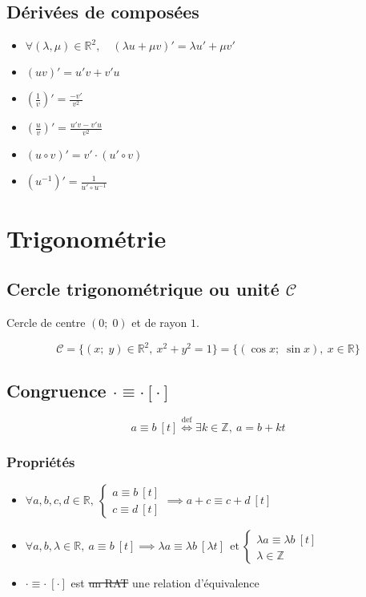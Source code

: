 \documentclass{article}
\newcommand{\R}{{\mathbb R}}
\newcommand{\Z}{{\mathbb Z}}
\newcommand{\et}{\:\text{et}\:}
\newcommand{\point}[2]{(#1;\;#2)}
\renewcommand{\cong}{\equiv}
\begin{document}
\subsection{Dérivées de composées}
\begin{itemize}
	\item $\forall (\lambda, \mu) \in \R^2,\quad (\lambda u + \mu v)' = \lambda u' + \mu v'$
	\item $(uv)' = u'v+v'u$
	\item $(\frac{1}{v})' = \frac{-v'}{v^2}$
	\item $(\frac{u}{v})' = \frac{u'v-v'u}{v^2}$
	\item $(u \circ v)' = v' \cdot  (u' \circ v)$
	\item $(u^{-1})' = \frac{1}{u' \circ u^{-1}}$
\end{itemize}

\section{Trigonométrie}
\subsection{Cercle trigonométrique ou unité $\mathcal C$}

Cercle de centre $\point{0}{0}$ et de rayon $1$.

\[
	\mathcal C = \{ \point{x}{y} \in \R^2,\: x^2 + y^2 = 1 \} = \{ \point{\cos x}{\sin x},\: x \in \R \} 
\] 

\subsection{Congruence $\cdot \cong \cdot [\cdot]$}

\[
	a \cong b\ [t] \stackrel{\text{def}}{\iff} \exists k\in \Z,\ a = b + kt

\] 
\subsubsection{Propriétés}

\begin{itemize}
	\item $\forall a, b, c, d\in \R,\ \begin{cases}
			a \cong b\ [t]\\
			c \cong d\ [t]
		\end{cases} \implies a + c \cong c + d\ [t]$
	\item $\forall a, b, \lambda \in \R,\ a\cong b\ [t] \implies \lambda a \cong \lambda b\ [\lambda t] \ \et \begin{cases}
			\lambda a \cong \lambda b\ [t] \\
			\lambda \in \Z
	\end{cases}$
\item $ \cdot \cong \cdot \ [ \cdot ]$ est \st{un RAT} une relation d'équivalence
\end{itemize}
\end{document}
